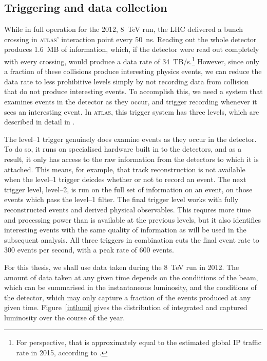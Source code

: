 \subsection{Triggering and data collection}
While in full operation for the 2012, 8~TeV run, the LHC delivered a bunch crossing in \textsc{atlas}' interaction point every 50~ns. Reading out the whole detector produces 1.6~MB of information, which, if the detector were read out completely with every crossing, would produce a data rate of 34~TB/s.\footnote{For perspective, that is approximately equal to the estimated global IP traffic rate in 2015, according to \cite{wolframip}.} However, since only a fraction of these collisions produce interesting physics events, we can reduce the data rate to less prohibitive levels simply by not recording data from collision that do not produce interesting events. To accomplish this, we need a system that examines events in the detector as they occur, and trigger recording whenever it sees an interesting event. In \textsc{atlas}, this trigger system has three levels, which are described in detail in \cite{detectorpaper}. 

The level--1 trigger genuinely does examine events as they occur in the detector. To do so, it runs on specialised hardware built in to the detectors, and as a result, it only has access to the raw information from the detectors to which it is attached. This means, for example, that track reconstruction is not available when the level--1 trigger deicdes whether or not to record an event. The next trigger level, level--2, is run on the full set of information on an event, on those events which pass the level--1 filter. The final trigger level works with fully reconstructed events and derived physical observables. This requres more time and processing power than is available at the previous levels, but it also identifies interesting events with the same quality of information as will be used in the subsequent analysis. All three triggers in combination cuts the final event rate to 300 events per second, with a peak rate of 600 events.

For this thesis, we shall use data taken during the 8~TeV run in 2012. The amount of data taken at any given time depends on the condiitions of the beam, which can be summarised in the instantaneous luminosity, and the conditions of the detector, which may only capture a fraction of the events produced at any given time. Figure~\ref{intlumi} gives the distribution of integrated and captured luminosity over the course of the year.

